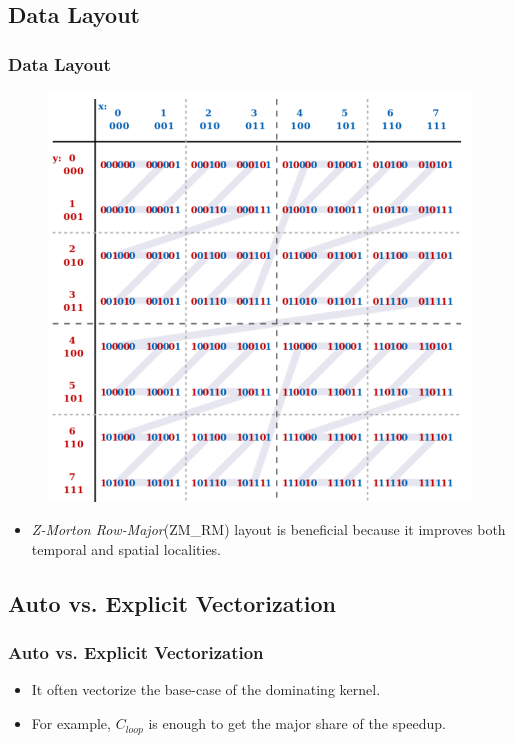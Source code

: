 \subsection{Data Layout}
\begin{frame}
    \frametitle{Data Layout}
	\begin{figure}
		\includegraphics[scale=0.2]{figure/fig-z-morton.png}
	\end{figure}
	\begin{itemize}
		\item \textit{Z-Morton Row-Major}(ZM\_RM) layout is beneficial because
			it improves both temporal and spatial localities.
	\end{itemize}
\end{frame}

\subsection{Auto vs. Explicit Vectorization}
\begin{frame}
    \frametitle{Auto vs. Explicit Vectorization}
	\begin{itemize}
		\item It often vectorize the base-case of the dominating kernel. 
		\item For example, $C_{\textit{loop}}$ is enough to get the 
			major share of the speedup.
	\end{itemize}
\end{frame}
